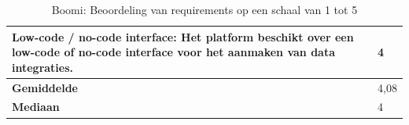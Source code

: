 \begin{landscape}
\begin{table}[H]
{\begin{tabular}{|ll|}
\multicolumn{1}{|l|}{Low-code / no-code interface: Het platform beschikt over een low-code of no-code interface voor het aanmaken van data integraties.}                                                                   & 4                            \\ \hline
\multicolumn{1}{|l|}{\textbf{Gemiddelde}}                                                                                                                                                                                  & 4,08                         \\ \hline
\multicolumn{1}{|l|}{\textbf{Mediaan}}                                                                                                                                                                                     & 4                            \\ \hline
\end{tabular}
}
\caption{Boomi: Beoordeling van requirements op een schaal van 1 tot 5}
\end{table}

\end{landscape}